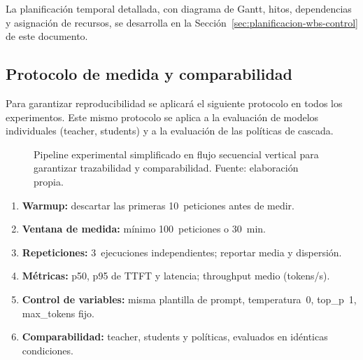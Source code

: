 \documentclass[11pt,a4paper]{article}
\begin{document}
La planificación temporal detallada, con diagrama de Gantt, hitos, dependencias y asignación de recursos, se desarrolla en la Sección~\ref{sec:planificacion-wbs-control} de este documento.

\subsection{Protocolo de medida y comparabilidad}

Para garantizar reproducibilidad se aplicará el siguiente protocolo en todos los experimentos. Este mismo protocolo se aplica a la evaluación de modelos individuales (teacher, students) y a la evaluación de las políticas de cascada.

\begin{figure}[H]
\centering
{}
\caption{Pipeline experimental simplificado en flujo secuencial vertical para garantizar trazabilidad y comparabilidad. Fuente: elaboración propia.}
\label{fig:pipeline-experimental}
\end{figure}

\begin{enumerate}[nosep,leftmargin=*]
\item \textbf{Warmup:} descartar las primeras 10~peticiones antes de medir.
\item \textbf{Ventana de medida:} mínimo 100~peticiones o 30~min.
\item \textbf{Repeticiones:} 3~ejecuciones independientes; reportar media y dispersión.
\item \textbf{Métricas:} p50, p95 de TTFT y latencia; throughput medio (tokens/s).
\item \textbf{Control de variables:} misma plantilla de prompt, temperatura~0, top\_p~1, max\_tokens fijo.
\item \textbf{Comparabilidad:} teacher, students y políticas, evaluados en idénticas condiciones.
\end{enumerate}
\end{document}
